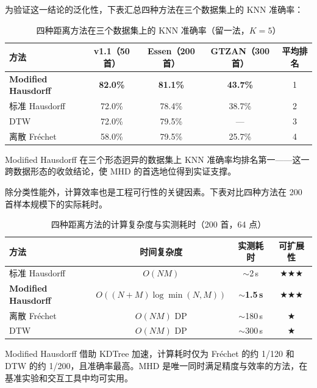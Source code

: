 \documentclass[withoutpreface]{cumcmthesis}
\begin{document}
为验证这一结论的泛化性，下表汇总四种方法在三个数据集上的 KNN 准确率：

\begin{table}[htbp]
    \centering
    \caption{四种距离方法在三个数据集上的 KNN 准确率（留一法，$K=5$）}
    \label{tab:cross_dataset_methods}
    \begin{tabular}{lcccc}
        \toprule
        \textbf{方法} & \textbf{v1.1（50 首）} & \textbf{Essen（200 首）} & \textbf{GTZAN（300 首）} & \textbf{平均排名} \\
        \midrule
        \textbf{Modified Hausdorff} & \textbf{82.0\%} & \textbf{81.1\%} & \textbf{43.7\%} & 1 \\
        标准 Hausdorff & 72.0\% & 78.4\% & 38.7\% & 2 \\
        DTW & 72.0\% & 79.5\% & — & 3 \\
        离散 Fr\'{e}chet & 58.0\% & 79.5\% & 25.7\% & 4 \\
        \bottomrule
    \end{tabular}
\end{table}

Modified Hausdorff 在三个形态迥异的数据集上 KNN 准确率均排名第一——这一跨数据形态的收敛结论，使 MHD 的首选地位得到实证支撑。

除分类性能外，计算效率也是工程可行性的关键因素。下表对比四种方法在 200 首样本规模下的实际耗时。

\begin{table}[htbp]
    \centering
    \caption{四种距离方法的计算复杂度与实测耗时（200 首，64 点）}
    \label{tab:complexity}
    \begin{tabular}{lccc}
        \toprule
        \textbf{方法} & \textbf{时间复杂度} & \textbf{实测耗时} & \textbf{可扩展性} \\
        \midrule
        标准 Hausdorff & $O(NM)$ & $\sim$2\,s & $\bigstar\bigstar\bigstar$ \\
        \textbf{Modified Hausdorff} & $O((N+M)\log\min(N,M))$ & $\sim$\textbf{1.5\,s} & $\bigstar\bigstar\bigstar$ \\
        离散 Fr\'{e}chet & $O(NM)$ DP & $\sim$180\,s & $\bigstar$ \\
        DTW & $O(NM)$ DP & $\sim$300\,s & $\bigstar$ \\
        \bottomrule
    \end{tabular}
\end{table}

Modified Hausdorff 借助 KDTree 加速，计算耗时仅为 Fr\'{e}chet 的约 1/120 和 DTW 的约 1/200，且准确率最高。MHD 是唯一同时满足精度与效率的方法，在基准实验和交互工具中均可实用。
\end{document}
